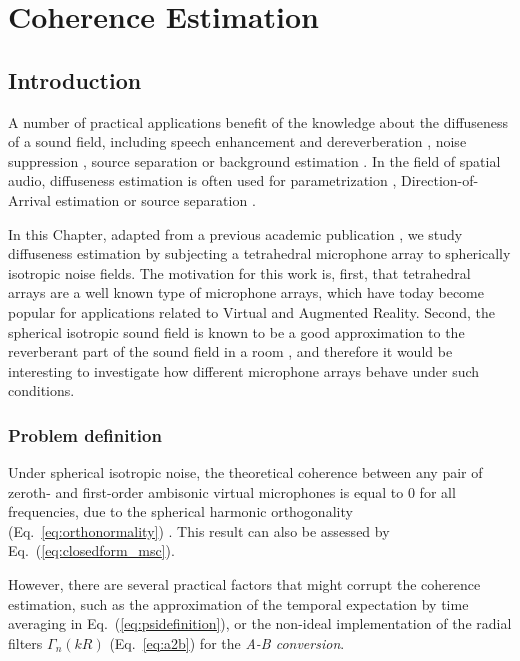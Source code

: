 \chapter{Coherence Estimation}
\label{chap:coherence}


\section{Introduction}

A number of practical applications benefit of the knowledge about the diffuseness of a sound field, including speech enhancement and dereverberation \cite{p_habets_dual-microphone_2006}, noise suppression \cite{ito_designing_2010}, source separation \cite{duong_under-determined_2009} or background estimation \cite{stefanakis_foreground_2015}. In the field of spatial audio, diffuseness estimation is often used for parametrization \cite{pulkki2006directional, politis_compass_2018}, Direction-of-Arrival estimation \cite{thiergart_localization_2009} or source separation \cite{motlicek_real-time_2013}.

In this Chapter, adapted from a previous academic publication \cite{stefanakis2019analysis},  we study diffuseness estimation by subjecting a tetrahedral microphone array to spherically isotropic noise fields.
The motivation for this work is, first, that tetrahedral arrays are a well known type of microphone arrays, which have today become popular for applications related to Virtual and Augmented Reality. 
Second, the spherical isotropic sound field is known to be a good approximation to the reverberant part of the sound field in a room \cite{elko_spatial_2001, mccowan_microphone_2003}, and therefore it would be interesting to investigate how different microphone arrays behave under such conditions.




\subsection{Problem definition}

Under spherical isotropic noise, the theoretical coherence between any pair of zeroth- and first-order ambisonic virtual microphones is equal to 0 for all frequencies, due to the spherical harmonic orthogonality (Eq.~\ref{eq:orthonormality}) \cite{elko_spatial_2001}. This result can also be assessed by Eq.~(\ref{eq:closedform_msc}).

However, there are several practical factors that might corrupt the coherence estimation, such as the approximation of the temporal expectation by time averaging \cite{thiergart_diffuseness_2011} in Eq.~(\ref{eq:psidefinition}), or the non-ideal implementation of the radial filters $\Gamma_n(kR)$ (Eq.~\ref{eq:a2b}) for the \textit{A-B conversion}\cite{schorkhuber_ambisonic_2017}.

